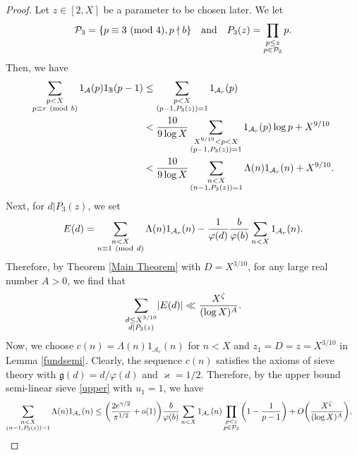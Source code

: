 \documentclass[12pt]{amsart}
\numberwithin{equation}{section}
\theoremstyle{remark}
\theoremstyle{definition}
\newcommand{\imod}[1]{\ (\mathrm{mod}\ #1)}
\begin{document}
\begin{proof}
Let $z\in [2, X]$ be a parameter to be chosen later. We let
\begin{align}
\notag \mathcal{P}_3=\{p\equiv 3\imod 4, p \nmid b\} \quad \text{and} \quad P_3(z) = \prod_{\substack{p\leq z\\p\in \mathcal{P}_3}}p.
\end{align}
Then, we have
\begin{align}
\label{upper1}\sum_{\substack{p<X\\p\equiv r\imod b}}1_{\mathcal{A}}(p) 1_{\mathbb{B}}(p-1) &\leq \sum_{\substack{p<X\\(p-1, P_3(z))=1}}1_{\mathcal{A}_r}(p)\\
\notag  &< \dfrac{10}{9\log X}\sum_{\substack{X^{9/10}<p<X\\(p-1, P_3(z))=1}}1_{\mathcal{A}_r}(p)\log p + X^{9/10}\\ 
\label{upper2} &< \dfrac{10}{9\log X}\sum_{\substack{n<X\\(n-1, P_3(z))=1}}\Lambda(n)1_{\mathcal{A}_r}(n) + X^{9/10}.
\end{align}
Next, for $d|P_3(z)$, we set
\begin{align}
\notag {E}(d)=\sum_{\substack{n<X\\n\equiv 1\imod d\\}}\Lambda(n)1_{\mathcal{A}_r}(n)- \dfrac{1}{\varphi(d)}\dfrac{b}{\varphi(b)}\sum_{\substack{n<X}}1_{\mathcal{A}_r}(n).
\end{align}
Therefore, by Theorem \ref{Main Theorem} with $D=X^{3/10}$, for any large real number $A>0$, we find that
\begin{align}
\notag \sum_{\substack{d\leq X^{3/10}\\d|P_3(z)}}\lvert {E}(d)\rvert \ll \dfrac{X^{\zeta}}{(\log X)^A}.
\end{align}
Now, we choose  $c(n)=\Lambda(n)1_{\mathcal{A}_r}(n)$  for $n<X$ and $z_1=D=z=X^{3/10}$ in Lemma \ref{fundsemi}. Clearly, the sequence $c(n)$ satisfies the axioms of sieve theory with $\mathfrak{g}(d)=d/\varphi(d)$ and $\varkappa =1/2$. Therefore, by the upper bound semi-linear sieve \eqref{upper} with $u_1=1$, we have 
\begin{align}
\notag \sum_{\substack{n<X\\(n-1, P_3(z))=1}}\Lambda(n)1_{\mathcal{A}_r}(n)\leq&~\bigg(\dfrac{2e^{\gamma/2}}{\pi^{1/2}} + o(1)\bigg) \dfrac{b}{\varphi(b)}\sum_{\substack{n<X}}1_{\mathcal{A}_r}(n)\prod_{\substack{p<z\\p\in \mathcal{P}_3}}\bigg(1-\dfrac{1}{p-1}\bigg)+ O\bigg(\dfrac{X^{\zeta}}{(\log X)^A}\bigg),

\end{align}
\end{proof}
\end{document}
